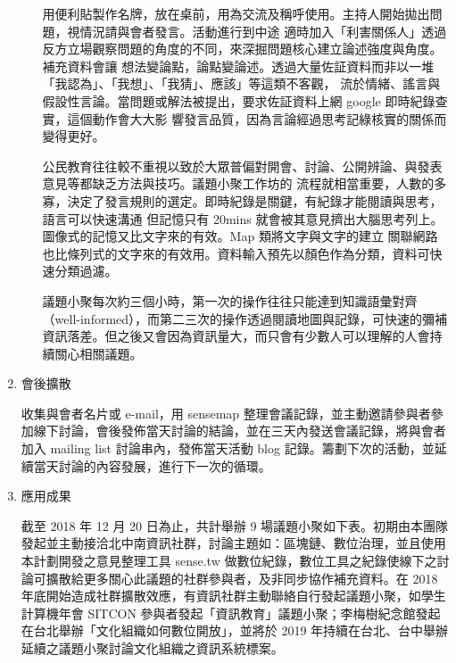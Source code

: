 \documentclass[12pt,a4paper]{article}
\begin{document}
\begin{enumerate}
\begin{enumerate}
用便利貼製作名牌，放在桌前，用為交流及稱呼使用。主持人開始拋出問題，視情況請與會者發言。活動進行到中途
適時加入「利害關係人」透過反方立場觀察問題的角度的不同，來深掘問題核心建立論述強度與角度。補充資料會讓
想法變論點，論點變論述。透過大量佐証資料而非以一堆「我認為」、「我想」、「我猜」、應該」等這類不客觀，
流於情緒、謠言與假設性言論。當問題或解法被提出，要求佐証資料上網 google 即時紀錄查實，這個動作會大大影
響發言品質，因為言論經過思考記綠核實的關係而變得更好。

公民教育往往較不重視以致於大眾普偏對開會、討論、公開辨論、與發表意見等都缺乏方法與技巧。議題小聚工作坊的
流程就相當重要，人數的多寡，決定了發言規則的選定。即時紀錄是關鍵，有紀錄才能閱讀與思考，語言可以快速溝通
但記憶只有 20mins 就會被其意見擠出大腦思考列上。圖像式的記憶又比文字來的有效。Map 類將文字與文字的建立
關聯網路也比條列式的文字來的有效用。資料輸入預先以顏色作為分類，資料可快速分類過濾。

議題小聚每次約三個小時，第一次的操作往往只能達到知識語彙對齊（well-informed），而第二三次的操作透過閱讀地圖與記錄，可快速的彌補資訊落差。但之後又會因為資訊量大，而只會有少數人可以理解的人會持續關心相關議題。
\end{enumerate}
\item 會後擴散
\label{sec:org8600868}

收集與會者名片或 e-mail，用 sensemap 整理會議記錄，並主動邀請參與者參加線下討論，會後發佈當天討論的結論，並在三天內發送會議記錄，將與會者加入 mailing list 討論串內，發佈當天活動 blog 記錄。籌劃下次的活動，並延續當天討論的內容發展，進行下一次的循環。

\item 應用成果
\label{sec:org6648655}

截至 2018 年 12 月 20 日為止，共計舉辦 9 場議題小聚如下表。初期由本團隊發起並主動接洽北中南資訊社群，討論主題如：區塊鏈、數位治理，並且使用本計劃開發之意見整理工具 sense.tw 做數位紀錄，數位工具之紀錄使線下之討論可擴散給更多關心此議題的社群參與者，及非同步協作補充資料。在 2018 年底開始造成社群擴散效應，有資訊社群主動聯絡自行發起議題小聚，如學生計算機年會 SITCON 參與者發起「資訊教育」議題小聚；李梅樹紀念館發起在台北舉辦「文化組織如何數位開放」，並將於 2019 年持續在台北、台中舉辦延續之議題小聚討論文化組織之資訊系統標案。


\end{enumerate}
\end{document}
